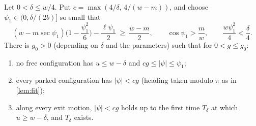 \begin{lemma}[confinement]\label{lem:confine}
Let $0<\delta\le w/4$.
Put $c=\max(4/\delta,\,4/(w-m))$, and choose $\psi_1\in(0,\delta/(2b)]$ so small that
\[
  (w-m\sec\psi_1)\Big(1-\frac{\psi_1^2}6\Big)-\frac{\ell\psi_1}2\ \ge\ \frac{w-m}2,\qquad \cos\psi_1>\frac mw,\qquad \frac{w\psi_1^2}{4}<\frac\delta4 .
\]
There is $g_0>0$ (depending on $\delta$ and the parameters) such that for $0<g\le g_0$:
\begin{enumerate}[label=(\roman*)]
\item no free configuration has $u\le w-\delta$ and $cg\le|\psi|\le\psi_1$;
\item every parked configuration has $|\psi|<cg$ (heading taken modulo $\pi$ as in \cref{lem:fit});
\item along every exit motion, $|\psi|<cg$ holds up to the first time $T_\delta$ at which $u\ge w-\delta$, and $T_\delta$ exists.
\end{enumerate}
\end{lemma}

